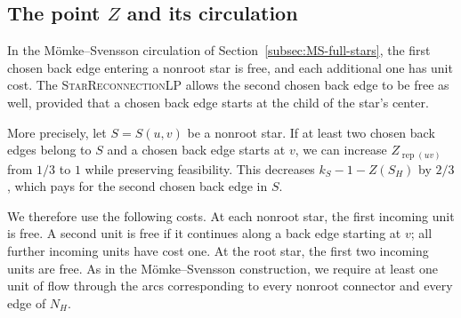 \documentclass[11pt]{amsart}
\newcommand{\rep}[1]{\operatorname{rep}(#1)}
\newcommand{\1}{\mathbbm{1}}
\newcommand{\LPtwo}{\textsc{StarReconnectionLP}}
\begin{document}
\subsection{The point \texorpdfstring{$Z$}{Z} and its circulation}
\label{sec:further-Z}

In the M\"omke--Svensson circulation of
Section~\ref{subsec:MS-full-stars}, the first chosen back edge
entering a nonroot star is free, and each additional one has
unit cost. The \LPtwo{} allows the second chosen back edge
to be free as well, provided that a chosen back edge starts
at the child of the star's center.

More precisely, let $S=S(u,v)$ be a nonroot star. If at least
two chosen back edges belong to $S$ and a chosen back edge
starts at $v$, we can increase $Z_{\rep{uv}}$ from $1/3$ to $1$
while preserving feasibility. This decreases
$k_S-1-Z(S_H)$ by $2/3$, which pays for the second chosen
back edge in $S$.

We therefore use the following costs. At each nonroot star,
the first incoming unit is free. A second unit is free if it
continues along a back edge starting at $v$; all further
incoming units have cost one. At the root star, the first
two incoming units are free. As in the M\"omke--Svensson
construction, we require at least one unit of flow through the arcs
corresponding to every nonroot connector and every edge of $N_H$.
\end{document}
